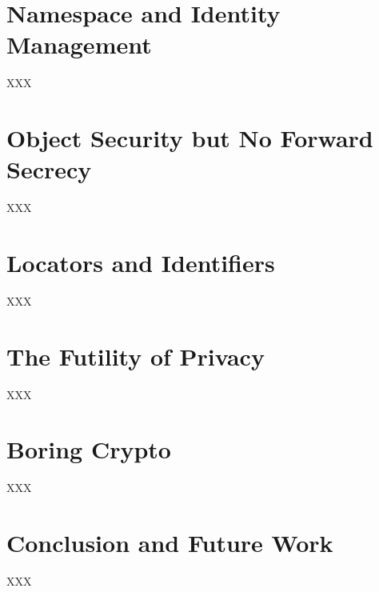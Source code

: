 \documentclass{sig-alternate-10pt}
\begin{document}
\section{Namespace and Identity Management}
XXX

\section{Object Security but No Forward Secrecy}
XXX

\section{Locators and Identifiers}
XXX

\section{The Futility of Privacy}
XXX

\section{Boring Crypto}
XXX

\section{Conclusion and Future Work}
XXX

\small


\end{document}
